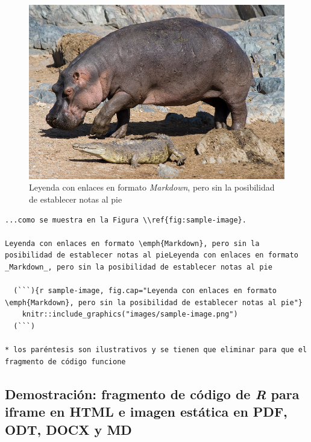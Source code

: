 \documentclass[
]{krantz}
\begin{document}
\begin{figure}
\centering
\includegraphics{images/sample-image.png}
\caption{\label{fig:sample-image}Leyenda con enlaces en formato \emph{Markdown}, pero sin la posibilidad de establecer notas al pie}
\end{figure}

\begin{verbatim}
...como se muestra en la Figura \\ref{fig:sample-image}.

Leyenda con enlaces en formato \emph{Markdown}, pero sin la posibilidad de establecer notas al pieLeyenda con enlaces en formato _Markdown_, pero sin la posibilidad de establecer notas al pie

  (```){r sample-image, fig.cap="Leyenda con enlaces en formato \emph{Markdown}, pero sin la posibilidad de establecer notas al pie"}
    knitr::include_graphics("images/sample-image.png")
  (```)

* los paréntesis son ilustrativos y se tienen que eliminar para que el fragmento de código funcione
\end{verbatim}

\hypertarget{demostraciuxf3n-fragmento-de-cuxf3digo-de-r-para-iframe-en-html-e-imagen-estuxe1tica-en-pdf-odt-docx-y-md}{%
\subsection{\texorpdfstring{Demostración: fragmento de código de \emph{R} para iframe en HTML e imagen estática en PDF, ODT, DOCX y MD}{Demostración: fragmento de código de R para iframe en HTML e imagen estática en PDF, ODT, DOCX y MD}}\label{demostraciuxf3n-fragmento-de-cuxf3digo-de-r-para-iframe-en-html-e-imagen-estuxe1tica-en-pdf-odt-docx-y-md}}
\end{document}
